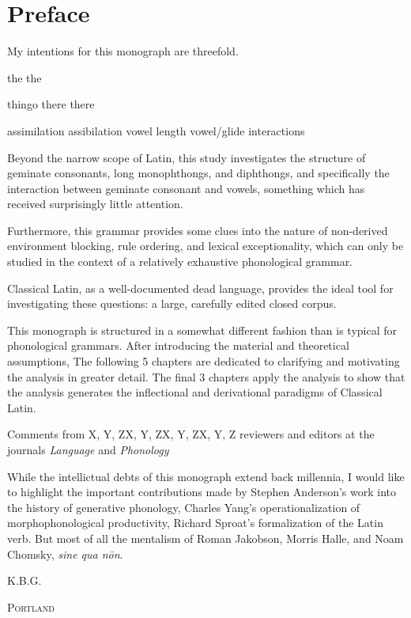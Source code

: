 \chapter*{Preface}

My intentions for this monograph are threefold.

the the 

thingo there there

assimilation
assibilation
vowel length
vowel/glide interactions

Beyond the narrow scope of Latin, this study investigates the structure of geminate consonants, long monophthongs, and diphthongs, and specifically the interaction between geminate consonant and vowels, something which has received surprisingly little attention.

Furthermore, this grammar provides some clues into the nature of non-derived environment blocking, rule ordering, and lexical exceptionality, which can only be studied in the context of a relatively exhaustive phonological grammar.

Classical Latin, as a well-documented dead language, provides the ideal tool for investigating these questions: a large, carefully edited closed corpus.

This monograph is structured in a somewhat different fashion than is typical for phonological grammars.
After introducing the material and theoretical assumptions,
The following 5 chapters are dedicated to clarifying and motivating the analysis in greater detail.
The final 3 chapters apply the analysis to show that the analysis generates the inflectional and derivational paradigms of Classical Latin.

Comments from X, Y, ZX, Y, ZX, Y, ZX, Y, Z
reviewers and editors at the journals \emph{Language} and \emph{Phonology}

While the intellictual debts of this monograph extend back millennia, I would like to highlight the important contributions made by Stephen Anderson's work into the history of generative phonology, Charles Yang's operationalization of morphophonological productivity, Richard Sproat's formalization of the Latin verb. But most of all the mentalism of Roman Jakobson, Morris Halle, and Noam Chomsky, \emph{sine qua nōn}.

\hfill\textsc{K.B.G.}

\noindent
\textsc{Portland}\\
\textsc{\monthname~\the\year}
